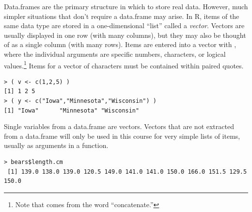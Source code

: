 \documentclass[10pt,openany]{book}\usepackage[]{graphicx}\usepackage[]{color}
\makeatletter
\newenvironment{kframe}{%
 \def\at@end@of@kframe{}%
 \ifinner\ifhmode%
  \def\at@end@of@kframe{\end{minipage}}%
  \begin{minipage}{\columnwidth}%
 \fi\fi%
 \def\FrameCommand##1{\hskip\@totalleftmargin \hskip-\fboxsep
 \colorbox{shadecolor}{##1}\hskip-\fboxsep
     \hskip-\linewidth \hskip-\@totalleftmargin \hskip\columnwidth}%
 \MakeFramed {\advance\hsize-\width
   \@totalleftmargin\z@ \linewidth\hsize
   \@setminipage}}%
 {\par\unskip\endMakeFramed%
 \at@end@of@kframe}
\newenvironment{knitrout}{}{} %
\makeatother
\begin{document}
Data.frames are the primary structure in which to store real data.  However, much simpler situations that don't require a data.frame may arise.  In R, items of the same data type  are stored in a one-dimensional ``list'' called a \emph{vector}.  Vectors are usually displayed in one row (with many columns), but they may also be thought of as a single column (with many rows).  Items are entered into a vector with , where the individual arguments are specific numbers, characters, or logical values.\footnote{Note that  comes from the word ``concatenate.''}  Items for a vector of characters must be contained within paired quotes.
\begin{knitrout}
\color{fgcolor}\begin{kframe}
\begin{verbatim}
> ( v <- c(1,2,5) )
[1] 1 2 5
> ( y <- c("Iowa","Minnesota","Wisconsin") )
[1] "Iowa"      "Minnesota" "Wisconsin"
\end{verbatim}
\end{kframe}
\end{knitrout}


Single variables from a data.frame are vectors.  Vectors that are not extracted from a data.frame will only be used in this course for very simple lists of items, usually as arguments in a function.
\begin{knitrout}
\color{fgcolor}\begin{kframe}
\begin{verbatim}
> bears$length.cm
 [1] 139.0 138.0 139.0 120.5 149.0 141.0 141.0 150.0 166.0 151.5 129.5 150.0
\end{verbatim}
\end{kframe}
\end{knitrout}

\end{document}
